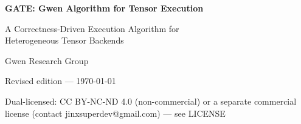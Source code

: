 \documentclass[11pt,a4paper]{article}
\theoremstyle{definition}
\begin{document}
\begin{center}
  {\LARGE\bfseries GATE: Gwen Algorithm for Tensor Execution\par}
  \vspace{0.5em}
  {\large A Correctness-Driven Execution Algorithm for\\Heterogeneous Tensor Backends\par}
  \vspace{1.5em}
  {\normalsize Gwen Research Group\par}
  \vspace{0.3em}
  {\small Revised edition --- \today\par}
  \vspace{0.3em}
  {\footnotesize Dual-licensed: CC BY-NC-ND 4.0 (non-commercial) or a
    separate commercial license (contact jinxsuperdev@gmail.com) --- see
    LICENSE\par}
\end{center}
\vspace{1em}
\end{document}
